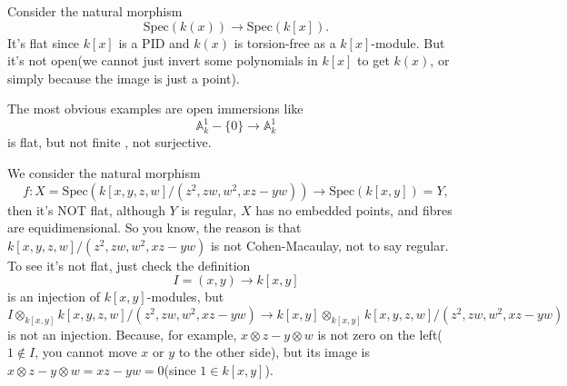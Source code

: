 \documentclass[../main.tex]{subfiles}
\begin{document}
\begin{example}
Consider the natural morphism 
$$\mathrm{Spec}(k(x))\rightarrow \mathrm{Spec}(k[x]).$$
It's flat since $k[x]$ is a PID and $k(x)$ is torsion-free as a $k[x]$-module. But it's not open(we cannot just invert some polynomials in $k[x]$ to get $k(x)$, or simply because the image is just a point).
\end{example}
\begin{example}
The most obvious examples are open immersions like
$$\mathbb{A}_{k}^{1}-\{0\}\rightarrow \mathbb{A}_{k}^{1}$$
is flat, but not finite , not surjective. 
\end{example}

\begin{example}
We consider the natural morphism
$$f:X=\mathrm{Spec}(k[x,y,z,w]/(z^{2},zw,w^{2},xz-yw))\rightarrow \mathrm{Spec}(k[x,y])=Y,$$
then it's NOT flat, although $Y$ is regular, $X$ has no embedded points, and fibres are equidimensional. So you know, the reason is that $k[x,y,z,w]/(z^{2},zw,w^{2},xz-yw)$ is not Cohen-Macaulay, not to say regular. To see it's not flat, just check the definition
$$I=(x,y)\rightarrow k[x,y]$$ is an injection of $k[x,y]$-modules, but 
$$I\otimes_{k[x,y]}k[x,y,z,w]/(z^{2},zw,w^{2},xz-yw)\rightarrow k[x,y]\otimes_{k[x,y]}k[x,y,z,w]/(z^{2},zw,w^{2},xz-yw)$$
is not an injection. Because, for example, $x\otimes z-y\otimes w$ is not zero on the left($1\notin I$, you cannot move $x$ or $y$ to the other side), but its image is $x\otimes z-y\otimes w=xz-yw=0$(since $1\in k[x,y]$).
\end{example}
\end{document}

